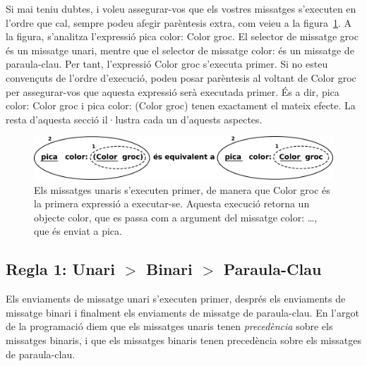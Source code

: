 Si mai teniu dubtes, i voleu assegurar-vos que els vostres missatges s'executen en l'ordre que cal, sempre podeu afegir parèntesis extra, com veieu a la figura~\ref{fig1102}. A la figura, s'analitza l'expressió \textsf{pica color: Color groc}. El selector de missatge \textsf{groc} és un missatge unari, mentre que el selector de missatge \textsf{color:} és un missatge de paraula-clau. Per tant, l'expressió \textsf{Color groc} s'executa primer. Si no esteu convençuts de l'ordre d'execució, podeu posar parèntesis al voltant de \textsf{Color groc} per assegurar-vos que aquesta expressió serà executada primer. És a dir, \textsf{pica color: Color groc} i  \textsf{pica color: (Color groc)} tenen exactament el mateix efecte. La resta d'aquesta secció il·lustra cada un d'aquests aspectes.
\begin{figure}[h]
\begin{center}
\includegraphics[scale=0.2]{Imatges/figura11-2.pdf}
\end{center}
\caption{Els missatges unaris s'executen primer, de manera que \textsf{\upshape Color groc} és la primera expressió a executar-se. Aquesta execució retorna un objecte color, que es passa com a argument del missatge \textsf{\upshape color: \dots}, que és enviat a \textsf{\upshape pica}.}
\label{fig1102}
\end{figure}
\subsection{Regla 1: Unari $>$ Binari $>$ Paraula-Clau}
Els enviaments de missatge unari s'executen primer, després els enviaments de missatge binari i finalment els enviaments de missatge de paraula-clau. En l'argot de la programació diem que els missatges unaris tenen \emph{precedència} sobre els missatges binaris, i que els missatges binaris tenen precedència sobre els missatges de paraula-clau.

